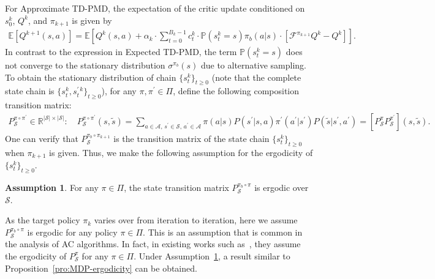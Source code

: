 \documentclass[10pt]{article}
\newcommand{\calA}{\mathcal{A}}
\newcommand{\calS}{\mathcal{S}}
\newcommand{\calF}{\mathcal{F}}
\newcommand{\E}{\mathbb{E}}
\renewcommand{\P}{\mathbb{P}}
\newcommand{\ls}{\left}
\newcommand{\rs}{\right}
\theoremstyle{plain}
\theoremstyle{definition}
\newtheorem{assumption}[theorem]{Assumption}
\begin{document}
For Approximate TD-PMD,  the expectation of the critic update conditioned on $s_0^k$, $Q^k$, and $\pi_{k+1}$ is given by 
\begin{align}
    \E\ls[Q^{k+1}(s,a)\rs] = \E \ls[Q^k(s,a) + \alpha_k\cdot \sum_{t=0}^{B_k-1} c_t^k\cdot {\P(s_t^k=s) \pi_b(a|s)}\cdot {\ls[ \calF^{\pi_{k+1}} Q^k - Q^k \rs]}  \rs].
    \label{eq:Approximated-TD-AC-PMD:intuition}
\end{align}
In contrast to the expression in Expected TD-PMD, the term $\P(s_t^k=s)$ does not converge to the stationary distribution $\sigma^{\pi_b}(s)$ due to alternative  sampling. To obtain the stationary distribution of chain $\{ s_t^k \}_{t\geq 0}$ (note that the complete state chain is $\{ s_t^k, s_t^{\prime\,k} \}_{t\geq0}$), for any $\pi, \pi^\prime \in \Pi$, define the following composition transition matrix:
\begin{align*}
    P^{\pi \circ \pi^\prime}_{\scriptscriptstyle \calS} \in \mathbb{R}^{|\calS|\times|\calS|}: \quad P^{\pi\circ\pi^\prime}_{\scriptscriptstyle\calS}(s,\tilde s) = \sum_{a\in\calA,\, s^\prime \in \calS,\, a^\prime \in \calA} \pi(a|s) P(s^\prime | s,a) \pi^\prime(a^\prime | s^\prime) P(\tilde s| s^\prime, a^\prime) = [P^{\pi}_{\scriptscriptstyle\calS} P^{\pi^\prime}_{\scriptscriptstyle\calS}](s, \tilde s).
\end{align*}
One can verify that $P^{\pi_b \circ \pi_{k+1}}_{\scriptscriptstyle \calS}$ is the transition matrix of the state chain $\{ s_t^k \}_{t\geq0}$ when $\pi_{k+1}$ is given.  Thus, we make the following assumption for the ergodicity of $\{ s_t^k \}_{t\geq 0}$.
\begin{assumption}
    For any $\pi\in\Pi$, the state transition matrix $P^{\pi_b\circ\pi}_{\scriptscriptstyle\calS}$ is ergodic over $\calS$.
    \label{ass:ergodicity-2}
\end{assumption}
\noindent As the target policy $\pi_k$ varies over from iteration to iteration, here we assume  $P^{\pi_b\circ\pi}_{\scriptscriptstyle\calS}$ is ergodic for any policy $\pi \in \Pi$. This is an assumption that is common in the analysis of AC algorithms. In fact, in   existing works such as~\citet{khodadadian2022finite,li2024stochastic,wang2024non}, they assume the ergodicity of $P^{\pi}_{\scriptscriptstyle\calS}$ for any $\pi\in\Pi$. Under Assumption~\ref{ass:ergodicity-2}, a result  similar to Proposition~\ref{pro:MDP-ergodicity} can be obtained.
\end{document}
